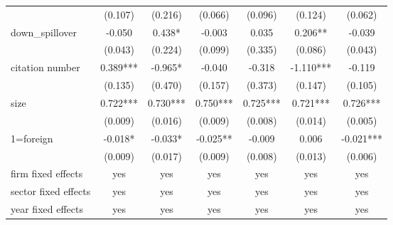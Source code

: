 \documentclass[12pt]{article}%
\begin{document}
\begin{CJK*}{GBK}{fs}
\begin{table}[!h]
{{{\begin{tabular}{l*{6}{c}}
           &    (0.107) &    (0.216) &    (0.066) &    (0.096) &    (0.124) &    (0.062) \\

down\_spillover &     -0.050 &     0.438* &     -0.003 &      0.035 &    0.206** &     -0.039 \\

           &    (0.043) &    (0.224) &    (0.099) &    (0.335) &    (0.086) &    (0.043) \\

citation number &   0.389*** &    -0.965* &     -0.040 &     -0.318 &  -1.110*** &-0.119 \\

           &    (0.135) &    (0.470) &    (0.157) &    (0.373) &    (0.147) &    (0.105) \\

      size &   0.722*** &   0.730*** &   0.750*** &   0.725*** &   0.721*** &   0.726*** \\

           &    (0.009) &    (0.016) &    (0.009) &    (0.008) &    (0.014) &    (0.005) \\

 1=foreign &    -0.018* &    -0.033* &   -0.025** &     -0.009 &      0.006 &  -0.021*** \\

           &    (0.009) &    (0.017) &    (0.009) &    (0.008) &    (0.013) &    (0.006) \\
firm fixed effects      &     yes         &       yes&     yes     &      yes&      yes        &     yes\\
sector fixed effects      &     yes         &       yes&     yes     &      yes&      yes        &     yes\\
year fixed effects      &     yes         &       yes&     yes     &      yes&      yes        &     yes\\


\end{tabular}}}}
\end{table}
\end{CJK*}
\end{document}

